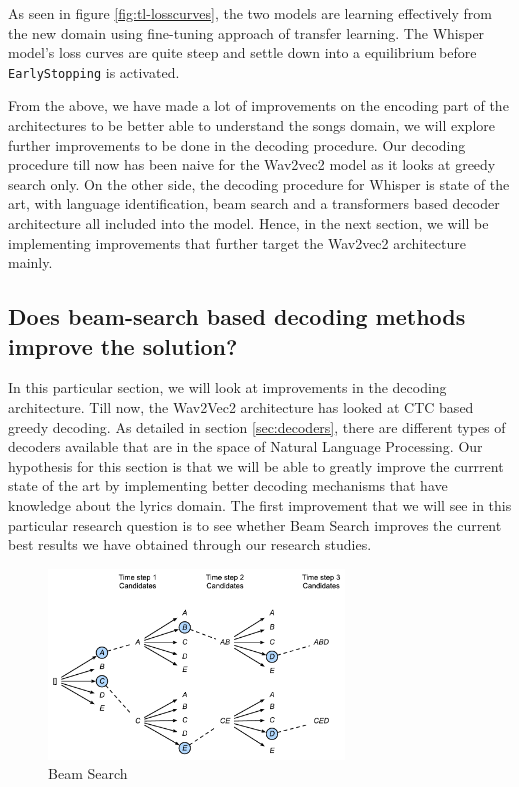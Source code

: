 As seen in figure \ref{fig:tl-losscurves}, the two models are learning effectively from the new domain using fine-tuning approach of transfer learning. The Whisper model's loss curves are quite steep and settle down into a equilibrium before \texttt{EarlyStopping} is activated.

From the above, we have made a lot of improvements on the encoding part of the architectures to be better able to understand the songs domain, we will explore further improvements to be done in the decoding procedure. Our decoding procedure till now has been naive for the Wav2vec2 model as it looks at greedy search only. On the other side, the decoding procedure for Whisper is state of the art, with language identification, beam search and a transformers based decoder architecture all included into the model. Hence, in the next section, we will be implementing improvements that further target the Wav2vec2 architecture mainly.


\subsection{Does beam-search based decoding methods improve the solution?}

In this particular section, we will look at improvements in the decoding architecture. Till now, the Wav2Vec2 architecture has looked at CTC based greedy decoding. As detailed in section \ref{sec:decoders}, there are different types of decoders available that are in the space of Natural Language Processing. Our hypothesis for this section is that we will be able to greatly improve the currrent state of the art by implementing better decoding mechanisms that have knowledge about the lyrics domain. The first improvement that we will see in this particular research question is to see whether Beam Search improves the current best results we have obtained through our research studies.


    \begin{figure}
    \centering
    \includegraphics[width=0.7\textwidth]{05-research study/figures/beam-search.pdf}
    \caption{Beam Search \cite{zhang2023dive}}
    \label{fig:beamsearch}
\end{figure}

